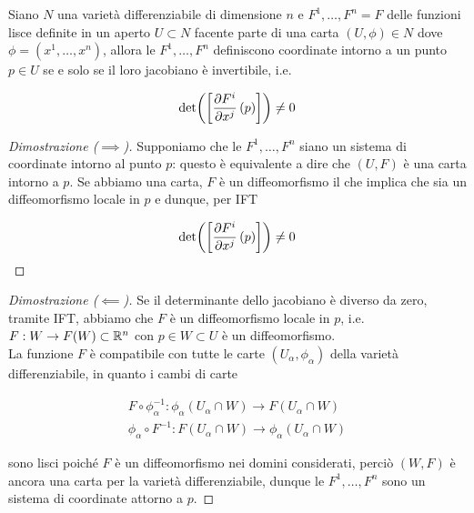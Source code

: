 \begin{corollary}[IFT]\label{ift-cor}
	Siano $ N $ una varietà differenziabile di dimensione $ n $ e $ F^{1},\dots,F^{n} = F $ delle funzioni lisce definite in un aperto $ U \subset N $ facente parte di una carta $ (U,\phi) \in N $ dove $ \phi = (x^{1},\dots,x^{n}) $, allora le $ F^{1},\dots,F^{n} $ definiscono coordinate intorno a un punto $ p \in U $ se e solo se il loro jacobiano è invertibile, i.e.
	
	\begin{equation}
		\det( \left[ \pdv{F^{i}}{x^{j}} \, (p) \right] ) \neq 0
	\end{equation}
\end{corollary}

\begin{proof}[Dimostrazione ($ \implies $)]
	Supponiamo che le $ F^{1},\dots,F^{n} $ siano un sistema di coordinate intorno al punto $ p $: questo è equivalente a dire che $ (U,F) $ è una carta intorno a $ p $. Se abbiamo una carta, $ F $ è un diffeomorfismo il che implica che sia un diffeomorfismo locale in $ p $ e dunque, per IFT
	
	\begin{equation}
		\det( \left[ \pdv{F^{i}}{x^{j}} \, (p) \right] ) \neq 0
	\end{equation}
\end{proof}

\begin{proof}[Dimostrazione ($ \impliedby $)]
	Se il determinante dello jacobiano è diverso da zero, tramite IFT, abbiamo che $ F $ è un diffeomorfismo locale in $ p $, i.e. $ F : W \to F(W) \subset \mathbb{R}^{n} $ con $ p \in W \subset U $ è un diffeomorfismo.\\
	La funzione $ F $ è compatibile con tutte le carte $ (U_{\alpha},\phi_{\alpha}) $ della varietà differenziabile, in quanto i cambi di carte
				
	\begin{gather}
			F \circ \phi_{\alpha}^{-1} : \phi_{\alpha}(U_{\alpha} \cap W) \to F(U_{\alpha} \cap W)\\
			\phi_{\alpha} \circ F^{-1} : F(U_{\alpha} \cap W) \to \phi_{\alpha}(U_{\alpha} \cap W)
	\end{gather}
			
	sono lisci poiché $ F $ è un diffeomorfismo nei domini considerati, perciò $ (W,F) $ è ancora una carta per la varietà differenziabile, dunque le $ F^{1},\dots,F^{n} $ sono un sistema di coordinate attorno a $ p $.
\end{proof}

